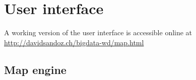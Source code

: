 \section{User interface}
A working version of the user interface is accessible online at \url{http://davidsandoz.ch/bigdata-wd/map.html}
\subsection{Map engine}

\subsection{}
